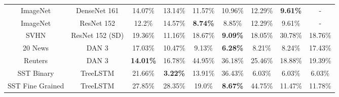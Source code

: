 {\begin{tabular}{c c c c c c c c c}
         ImageNet &     DenseNet 161 &       14.07\% &        13.14\% &   11.57\% &   10.96\% &        12.29\% &        {\bf9.61\%} &              - \\
         ImageNet &       ResNet 152 &        12.2\% &        14.57\% &  {\bf8.74\%} &    8.85\% &        12.29\% &          9.61\% &              - \\
             SVHN &  ResNet 152 (SD) &       19.36\% &        11.16\% &   18.67\% &  {\bf9.09\%} &        18.05\% &         30.78\% &         18.76\% \\
              \midrule
          20 News &            DAN 3 &       17.03\% &        10.47\% &    9.13\% &  {\bf6.28\%} &         8.21\% &          8.24\% &         17.43\% \\
          Reuters &            DAN 3 &     {\bf14.01\%} &        16.78\% &   44.95\% &   36.18\% &        25.46\% &         18.88\% &         19.39\% \\
       SST Binary &         TreeLSTM &       21.66\% &       {\bf3.22\%} &   13.91\% &   36.43\% &         6.03\% &          6.03\% &          6.03\% \\
 SST Fine Grained &         TreeLSTM &       27.85\% &        28.35\% &    19.0\% &  {\bf8.67\%} &        44.75\% &         11.47\% &         11.78\% \\
\bottomrule
\end{tabular}
}
